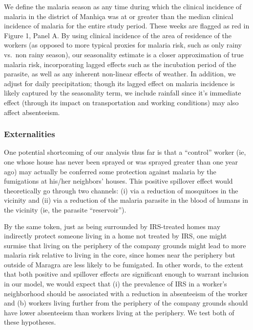 \documentclass[]{article}
\begin{document}
We define the malaria season as any time during which the clinical
incidence of malaria in the district of Manhiça was at or greater than
the median clinical incidence of malaria for the entire study period.
These weeks are flagged as red in Figure 1, Panel A. By using clinical
incidence of the area of residence of the workers (as opposed to more
typical proxies for malaria risk, such as only rainy vs.~non rainy
season), our seasonality estimate is a closer approximation of true
malaria risk, incorporating lagged effects such as the incubation period
of the parasite, as well as any inherent non-linear effects of weather.
In addition, we adjust for daily precipitation; though its lagged effect
on malaria incidence is likely captured by the seasonality term, we
include rainfall since it's immediate effect (through its impact on
transportation and working conditions) may also affect absenteeism.

\subsubsection{Externalities}\label{externalities}

One potential shortcoming of our analysis thus far is that a ``control''
worker (ie, one whose house has never been sprayed or was sprayed
greater than one year ago) may actually be conferred some protection
against malaria by the fumigations at his/her neighbors' houses. This
positive spillover effect would theoretically go through two channels:
(i) via a reduction of mosquitoes in the vicinity and (ii) via a
reduction of the malaria parasite in the blood of humans in the vicinity
(ie, the parasite ``reservoir'').

By the same token, just as being surrounded by IRS-treated homes may
indirectly protect someone living in a home not treated by IRS, one
might surmise that living on the periphery of the company grounds might
lead to more malaria risk relative to living in the core, since homes
near the periphery but outside of Maragra are less likely to be
fumigated. In other words, to the extent that both positive and
spillover effects are significant enough to warrant inclusion in our
model, we would expect that (i) the prevalence of IRS in a worker's
neighborhood should be associated with a reduction in absenteeism of the
worker and (b) workers living further from the periphery of the company
grounds should have lower absenteeism than workers living at the
periphery. We test both of these hypotheses.
\end{document}
